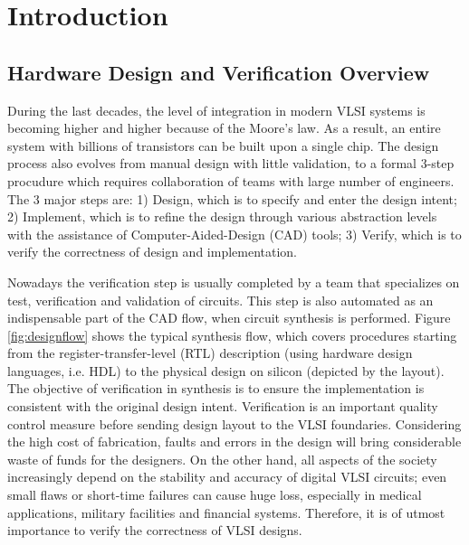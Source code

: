 \chapter{Introduction}
\label{ch:intro}





\section{Hardware Design and Verification Overview}
During the last decades, the level of integration in modern VLSI systems is becoming higher and higher because of the Moore's law.
As a result, an entire system with billions of transistors can be built upon a single chip.
The design process also evolves from manual design with little validation, to 
a formal 3-step procudure which requires collaboration of teams with large number of 
engineers. The 3 major steps are: 1) Design, which is to specify and enter the design intent;
2) Implement, which is to refine the design through various abstraction levels with the assistance of Computer-Aided-Design (CAD)
tools; 3) Verify, which is to verify the correctness of design and implementation.

Nowadays the verification step is usually completed by a team that specializes on test, verification and validation of 
circuits. This step is also automated as an indispensable part of the CAD flow, when circuit synthesis is performed. 
Figure \ref{fig:designflow} shows the typical synthesis flow, which covers procedures starting from the 
register-transfer-level (RTL) description (using hardware design languages, i.e. HDL) to  the 
physical design on silicon (depicted by the layout). The objective of verification in synthesis is 
to ensure the implementation is consistent with the original design intent. Verification is 
an important quality control measure before sending design layout to the VLSI foundaries.
Considering the high cost of fabrication, faults and errors in the design will bring considerable 
waste of funds for the designers. On the other hand, all aspects of the society increasingly depend on 
the stability and accuracy of digital VLSI circuits; even small flaws or short-time failures can cause 
huge loss, especially in medical applications, military facilities and financial systems.
Therefore, it is of utmost importance to verify the correctness of VLSI designs.

